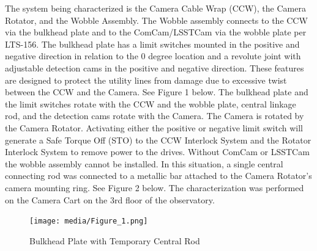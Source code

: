 \documentclass[SE,lsstdraft,authoryear,toc]{lsstdoc}
\begin{document}
The system being characterized is the Camera Cable Wrap (CCW), the
Camera Rotator, and the Wobble Assembly. The Wobble assembly connects to
the CCW via the bulkhead plate and to the ComCam/LSSTCam via the wobble
plate per LTS-156. The bulkhead plate has a limit switches mounted in
the positive and negative direction in relation to the 0 degree location
and a revolute joint with adjustable detection cams in the positive and
negative direction. These features are designed to protect the utility
lines from damage due to excessive twist between the CCW and the Camera.
See Figure 1 below. The bulkhead plate and the limit switches rotate
with the CCW and the wobble plate, central linkage rod, and the
detection cams rotate with the Camera. The Camera is rotated by the
Camera Rotator. Activating either the positive or negative limit switch
will generate a Safe Torque Off (STO) to the CCW Interlock System and
the Rotator Interlock System to remove power to the drives. Without
ComCam or LSSTCam the wobble assembly cannot be installed. In this
situation, a single central connecting rod was connected to a metallic
bar attached to the Camera Rotator's camera mounting ring. See Figure 2
below. The characterization was performed on the Camera Cart on the 3rd
floor of the observatory.

\begin{figure}
\begin{center}
  \texttt{[image: media/Figure\_1.png]}
\end{center}
\caption{Bulkhead Plate with Temporary Central Rod}
\label{fig:Figure_1}
\end{figure}
\end{document}

